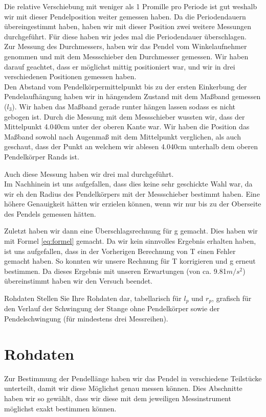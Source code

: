 \documentclass[twoside]{protokoll}
\begin{document}
Die relative Verschiebung mit weniger als 1 Promille pro Periode ist gut weshalb wir mit dieser Pendelposition weiter gemessen haben.
Da die Periodendauern übereingestimmt haben, haben wir mit dieser Position zwei weitere Messungen durchgeführt.
Für diese haben wir jedes mal die Periodendauer überschlagen.\\

Zur Messung des Durchmessers, haben wir das Pendel vom Winkelaufnehmer genommen und mit dem Messschieber den Durchmesser gemessen.
Wir haben darauf geachtet, dass er möglichst mittig positioniert war, und wir in drei verschiedenen Positionen gemessen haben. \\

Den Abstand vom Pendelkörpermittelpunkt bis zu der ersten Einkerbung der Pendelaufhängung haben wir in hängendem Zustand mit dem Maßband gemessen ($l_3$).
Wir haben das Maßband gerade runter hängen lassen sodass es nicht gebogen ist. 
Durch die Messung mit dem Messschieber wussten wir, dass der Mittelpunkt 4.040cm unter der oberen Kante war.
Wir haben die Position das Maßband sowohl nach Augenmaß mit dem Mittelpunkt verglichen, als auch geschaut, 
dass der Punkt an welchem wir ablesen 4.040cm unterhalb dem oberen Pendelkörper Rands ist.

Auch diese Messung haben wir drei mal durchgeführt.\\
Im Nachhinein ist uns aufgefallen, dass dies keine sehr geschickte Wahl war, da wir eh den Radius des Pendelkörpers mit der Messschieber bestimmt haben.
Eine höhere Genauigkeit hätten wir erzielen können, wenn wir nur bis zu der Oberseite des Pendels gemessen hätten. 

Zuletzt haben wir dann eine Überschlagsrechnung für g gemacht. Dies haben wir mit Formel \ref{eq:formel} gemacht.
Da wir kein sinnvolles Ergebnis erhalten haben, ist uns aufgefallen, dass in der Vorherigen Berechnung von T einen Fehler gemacht haben. 
So konnten wir unsere Rechnung für T korrigieren und g erneut bestimmen. Da dieses Ergebnis mit unseren Erwartungen (von ca. 9.81$m/s^2$) übereinstimmt haben wir den Versuch beendet.

\begin{aufgabe}{Rohdaten}
  Stellen Sie Ihre Rohdaten dar, tabellarisch für $l_p$ und $r_p$,
  grafisch für den Verlauf der Schwingung der Stange ohne Pendelkörper
  sowie der Pendelschwingung (für mindestens drei Messreihen).
\end{aufgabe}

\section{Rohdaten}
Zur Bestimmung der Pendellänge haben wir das Pendel in verschiedene Teilstücke unterteilt, damit wir diese Möglichst genau messen können. 
Dies Abschnitte haben wir so gewählt, dass wir diese mit dem jeweiligen Messinstrument möglichst exakt bestimmen können. 
\end{document}

